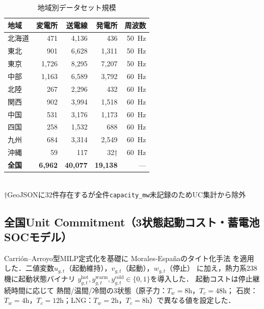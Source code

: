 \documentclass[fleqn]{ieej}
\begin{document}
\begin{table}[t]
  \caption{地域別データセット規模}
  \label{tab:dataset}
  \centering\small
  \begin{tabular}{lrrrr}
    \toprule
    地域 & 変電所 & 送電線 & 発電所 & 周波数 \\
    \midrule
    北海道 &    471 &  4,136 &    436 & 50~Hz \\
    東北   &    901 &  6,628 &  1,311 & 50~Hz \\
    東京   &  1,726 &  8,295 &  7,207 & 50~Hz \\
    中部   &  1,163 &  6,589 &  3,792 & 60~Hz \\
    北陸   &    267 &  2,296 &    432 & 60~Hz \\
    関西   &    902 &  3,994 &  1,518 & 60~Hz \\
    中国   &    531 &  3,176 &  1,173 & 60~Hz \\
    四国   &    258 &  1,532 &    688 & 60~Hz \\
    九州   &    684 &  3,314 &  2,549 & 60~Hz \\
    沖縄   &     59 &    117 &     32†& 60~Hz \\
    \midrule
    \textbf{全国} & \textbf{6,962} & \textbf{40,077} & \textbf{19,138} & --- \\
    \bottomrule
  \end{tabular}\\[2pt]
  {\scriptsize †GeoJSONに32件存在するが全件\texttt{capacity\_mw}未記録のためUC集計から除外}
\end{table}

\subsection{全国Unit Commitment（3状態起動コスト・蓄電池SOCモデル）}

Carri\'{o}n--Arroyo型MILP定式化\cite{carrion2006}を基礎に
Morales-Espa\~{n}aのタイト化手法\cite{moralesespana2013tight,moralesespana2013startup}
を適用した．二値変数$u_{g,t}$（起動維持），$v_{g,t}$（起動），$w_{g,t}$（停止）
に加え，熱力系238機に起動状態バイナリ
$y_{g,t}^{\mathrm{hot}},y_{g,t}^{\mathrm{warm}},y_{g,t}^{\mathrm{cold}}\in\{0,1\}$を導入した．
起動コストは停止継続時間に応じて
熱間/温間/冷間の3状態（原子力：$T_w{=}8$h，$T_c{=}48$h；
石炭：$T_w{=}4$h，$T_c{=}12$h；LNG：$T_w{=}2$h，$T_c{=}8$h）で異なる値を設定した．
\end{document}

